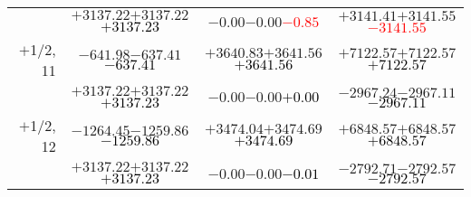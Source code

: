 \documentclass[compress]{beamer}
\begin{document}
\begin{frame}
{\begin{tabular}{r | c | c | c}
           & $+3137.22$\hspace{0.1 cm}$+3137.22$\hspace{0.1 cm}\textcolor{black}{$+3137.23$} & $-0.00$\hspace{0.1 cm}$-0.00$\hspace{0.1 cm}\textcolor{red}{$-0.85$} & $+3141.41$\hspace{0.1 cm}$+3141.55$\hspace{0.1 cm}\textcolor{red}{$-3141.55$} \\
$+$1/2, 11 & $-641.98$\hspace{0.1 cm}$-637.41$\hspace{0.1 cm}\textcolor{black}{$-637.41$} & $+3640.83$\hspace{0.1 cm}$+3641.56$\hspace{0.1 cm}\textcolor{black}{$+3641.56$} & $+7122.57$\hspace{0.1 cm}$+7122.57$\hspace{0.1 cm}\textcolor{black}{$+7122.57$} \\
           & $+3137.22$\hspace{0.1 cm}$+3137.22$\hspace{0.1 cm}\textcolor{black}{$+3137.23$} & $-0.00$\hspace{0.1 cm}$-0.00$\hspace{0.1 cm}\textcolor{black}{$+0.00$} & $-2967.24$\hspace{0.1 cm}$-2967.11$\hspace{0.1 cm}\textcolor{black}{$-2967.11$} \\
$+$1/2, 12 & $-1264.45$\hspace{0.1 cm}$-1259.86$\hspace{0.1 cm}\textcolor{black}{$-1259.86$} & $+3474.04$\hspace{0.1 cm}$+3474.69$\hspace{0.1 cm}\textcolor{black}{$+3474.69$} & $+6848.57$\hspace{0.1 cm}$+6848.57$\hspace{0.1 cm}\textcolor{black}{$+6848.57$} \\
           & $+3137.22$\hspace{0.1 cm}$+3137.22$\hspace{0.1 cm}\textcolor{black}{$+3137.23$} & $-0.00$\hspace{0.1 cm}$-0.00$\hspace{0.1 cm}\textcolor{black}{$-0.01$} & $-2792.71$\hspace{0.1 cm}$-2792.57$\hspace{0.1 cm}\textcolor{black}{$-2792.57$} \\
\end{tabular}}
\end{frame}
\end{document}
